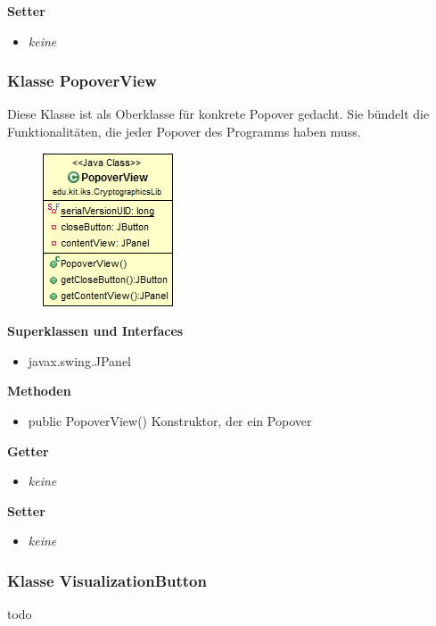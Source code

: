 \documentclass{article}
\begin{document}
      \textbf{Setter}
      \begin{itemize}
        \item \textit{keine}
      \end{itemize}
	
	\subsubsection{Klasse PopoverView}
	  Diese Klasse ist als Oberklasse für konkrete Popover gedacht. Sie
	  bündelt die Funktionalitäten, die jeder Popover des Programms haben muss.
	
      \begin{figure}[H]
        \centering
        \includegraphics{resources/edu-kit-iks-CryptographicsLib-PopoverView}
      \end{figure}
	
      \textbf{Superklassen und Interfaces}
      \begin{itemize}
        \item javax.swing.JPanel
      \end{itemize}
	
      \textbf{Methoden}
      \begin{itemize}
        \item public PopoverView() \newline
          Konstruktor, der ein Popover 
      \end{itemize}
      
      \textbf{Getter}
      \begin{itemize}
		\item \textit{keine}
      \end{itemize}
      
      \textbf{Setter}
      \begin{itemize}
        \item \textit{keine}
      \end{itemize}
	
	\subsubsection{Klasse VisualizationButton}
	  todo
	
\end{document}
